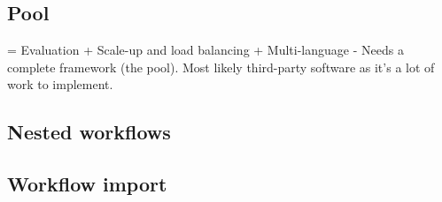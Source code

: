 \documentclass[preprint,3p,twocolumn]{elsarticle}
\begin{document}
\subsection{Pool}

= Evaluation
+ Scale-up and load balancing
+ Multi-language
- Needs a complete framework (the pool). Most likely third-party software as it's a lot of work to implement.

\subsection{Nested workflows}

\subsection{Workflow import}
\end{document}
